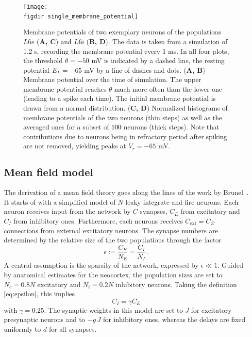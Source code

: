 \begin{figure}[htpb]
    \centering
    \texttt{[image: \\figdir single\_membrane\_potential]}
    \caption{
        Membrane potentials of two exemplary neurons of the populations 
        $L6e$ (\textbf{A, C}) and $L6i$ (\textbf{B, D}). The data is taken from 
        a simulation of 1.2 s, recording the membrane potential every 1 ms. 
        In all four plots, the threshold $\theta = -50$ mV is indicated by a dashed line, 
        the resting potential $E_L = -65$ mV by a line of dashes and dots. 
        \quad (\textbf{A, B}) Membrane potential over the time of simulation. 
        The upper membrane potential reaches $\theta$ much more often than the lower one 
        (leading to a spike each time). The initial membrane potential 
        is drawn from a normal distribution.
        \quad (\textbf{C, D}) Normalized histograms of membrane potentials of the
        two neurons (thin steps) as well as the averaged ones for a subset of $100$ 
        neurons (thick steps). 
        Note that contributions due to neurons being in refractory 
        period after spiking are not removed, yielding peaks at $V_r = -65$ mV. 
    }
    \label{fig:single_membrane_potential}
\end{figure}



\subsection{Mean field model}
The derivation of a mean field theory goes along the 
lines of the work by Brunel~\cite{brunel2000}.
It starts of with a simplified model of 
$N$ leaky integrate-and-fire neurons. 
Each neuron receives input from the network by $C$ synapses, 
$C_E$ from excitatory and $C_I$ from inhibitory ones. 
Furthermore, each neurons receives $C_\text{ext} = C_E$ connections from 
external excitatory neurons.
The synapse numbers 
are determined by the relative size of the two populations through the factor
\begin{equation}
    \epsilon := \frac{C_E}{N_E} = \frac{C_I}{N_I} \,.
    \label{eq:epsilon}
\end{equation}
A central assumption is the sparsity of the network, expressed by $\epsilon \ll 1$.
Guided by anatomical estimates for the neocortex, the population sizes are set to
$N_e = 0.8N$ excitatory and $N_i = 0.2N$ inhibitory neurons. Taking the definition
\eqref{eq:epsilon}, this implies 
\begin{equation}
    C_I = \gamma C_E 	
 \label{eq:C_I}
\end{equation}
with $\gamma = 0.25$. The synaptic weights in this model are set to $J$ for 
excitatory presynaptic neurons and to $-g\, J$ for inhibitory ones, 
whereas the delays are fixed uniformly to $d$ for all synapses. 

